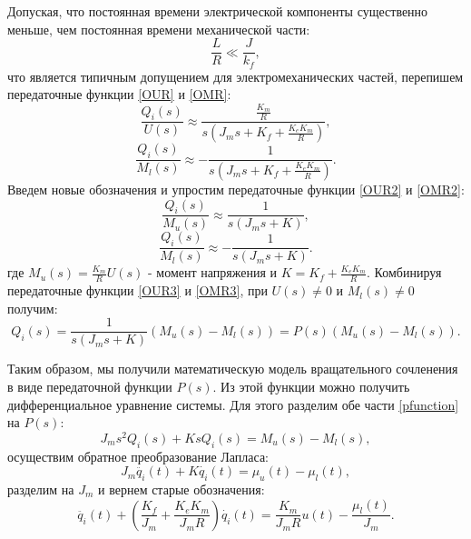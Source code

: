 Допуская, что постоянная времени электрической компоненты существенно меньше, чем постоянная времени механической части:
\begin{equation}
	\frac{L}{R}\ll\frac{J}{k_f},
\end{equation}
что является типичным допущением для электромеханических частей, перепишем передаточные функции \eqref{OUR} и \eqref{OMR}:
\begin{equation}\label{OUR2}
	\frac{Q_i(s)}{U(s)}\approx\frac{\frac{K_m}{R}}{s(J_ms+K_f+\frac{K_eK_m}{R})},
\end{equation}
\begin{equation}\label{OMR2}
	\frac{Q_i(s)}{M_l(s)}\approx-\frac{1}{s(J_ms+K_f+\frac{K_eK_m}{R})}.
\end{equation}
Введем новые обозначения и упростим передаточные функции \eqref{OUR2} и \eqref{OMR2}:
\begin{equation}\label{OUR3}
	\frac{Q_i(s)}{M_u(s)}\approx\frac{1}{s(J_ms+K)},
\end{equation}
\begin{equation}\label{OMR3}
	\frac{Q_i(s)}{M_l(s)}\approx-\frac{1}{s(J_ms+K)}.
\end{equation}
где $M_u(s)= \frac{K_m}{R}U(s)$ - момент напряжения и $K=K_f+\frac{K_eK_m}{R}$.
Комбинируя передаточные функции \eqref{OUR3} и \eqref{OMR3}, при $U(s)\neq0$ и $M_l(s)\neq0$ получим:
\begin{equation}\label{pfunction}
	Q_i(s)=\frac{1}{s(J_ms+K)}(M_u(s)-M_l(s))=P(s)(M_u(s)-M_l(s)).
\end{equation}

Таким образом, мы получили математическую модель вращательного сочленения в виде передаточной функции $P(s)$. Из этой функции можно получить дифференциальное уравнение системы. Для этого разделим обе части \eqref{pfunction} на $P(s)$:
\begin{equation}
	J_ms^2Q_i(s)+KsQ_i(s)=M_u(s)-M_l(s),
\end{equation}
осуществим обратное преобразование Лапласа:
\begin{equation}
	J_m\ddot{q_i}(t)+K\dot{q_i}(t)=\mu_u(t)-\mu_l(t),
\end{equation}
разделим на $J_m$ и вернем старые обозначения:
\begin{equation}\label{dif}
	\ddot{q_i}(t)+(\frac{K_f}{J_m}+\frac{K_eK_m}{J_mR})\dot{q_i}(t)=\frac{K_m}{J_mR}u(t)-\frac{\mu_l(t)}{J_m}.
\end{equation}
